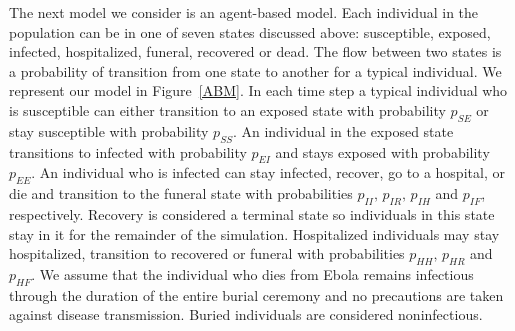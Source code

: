 The next model we consider is an agent-based model. Each individual in the population can be in one of seven states discussed above: susceptible, exposed, infected, hospitalized, funeral, recovered or dead. The flow between two states is a  probability of transition from one state to another for a typical individual. We represent our model in Figure~\ref{ABM}. In each time step a typical individual who is susceptible can either transition to an exposed state with probability $p_{SE}$ or stay susceptible with probability $p_{SS}$. An individual in the exposed state transitions to infected with probability $p_{EI}$ and stays exposed with probability $p_{EE}$. An individual who is infected can stay infected, recover, go to a hospital, or die and transition to the funeral state with probabilities $p_{II},\, p_{IR},\, p_{IH}$ and $p_{IF}$, respectively. Recovery is considered a terminal state so individuals in this state stay in it for the remainder of the simulation. Hospitalized individuals may stay hospitalized, transition to recovered or funeral with probabilities $p_{HH}, \, p_{HR}$ and $p_{HF}$. We assume that the individual who dies from Ebola remains infectious through the duration of the entire burial ceremony and no precautions are taken against disease transmission. Buried individuals are considered noninfectious.  

